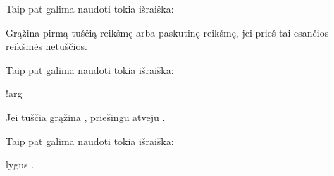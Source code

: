 \documentclass[letterpaper,10pt,lithuanian]{sphinxmanual}
\begin{document}
\begin{fulllineitems}
\label{\detokenize{formules:and}}
\pysigstartsignatures
\pysiglinewithargsret
{}
{}
{}
\pysigstopsignatures
\sphinxAtStartPar
Taip pat galima naudoti tokia išraiška:

\begin{sphinxVerbatim}[commandchars=\\\{\}]
    
\end{sphinxVerbatim}

\sphinxAtStartPar
Grąžina pirmą tuščią reikšmę arba paskutinę reikšmę, jei prieš tai esančios
reikšmės netuščios.

\end{fulllineitems}


\begin{fulllineitems}
\label{\detokenize{formules:not}}
\pysigstartsignatures
\pysiglinewithargsret
{}
{}
{}
\pysigstopsignatures
\sphinxAtStartPar
Taip pat galima naudoti tokia išraiška:

\begin{sphinxVerbatim}[commandchars=\\\{\}]
!arg
\end{sphinxVerbatim}

\sphinxAtStartPar
Jei  tuščia grąžina , priešingu atveju .

\end{fulllineitems}


\begin{fulllineitems}
\label{\detokenize{formules:eq}}
\pysigstartsignatures
\pysiglinewithargsret
{}
{\sphinxparamcomma {}}
{}
\pysigstopsignatures
\sphinxAtStartPar
Taip pat galima naudoti tokia išraiška:

\begin{sphinxVerbatim}[commandchars=\\\{\}]
  
\end{sphinxVerbatim}

\sphinxAtStartPar
{} lygus .

\end{fulllineitems}
\end{document}
